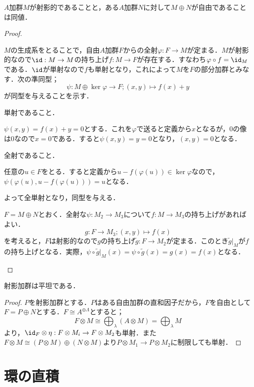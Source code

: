 \begin{thm}\label{thm:射影的と自由の直和因子は同値}
	$A$加群$M$が射影的であることと，ある$A$加群$N$に対して$M\oplus N$が自由であることは同値．
\end{thm}
\begin{proof}
	\begin{eqv}
		\item 
		$M$の生成系をとることで，自由$A$加群$F$からの全射$\varphi:F\to M$が定まる．$M$が射影的なので$\id:M\to M$の持ち上げ$f:M\to F$が存在する．すなわち$\varphi\circ f=\id_M$である．$\id$が単射なので$f$も単射となり，これによって$M$を$F$の部分加群とみなす．次の準同型；
		\[\psi:M\oplus \ker\varphi\to F;(x,y)\mapsto f(x)+y\]
		が同型を与えることを示す．
		
		\begin{mrkw}
			\item 単射であること．
			
			$\psi(x,y)=f(x)+y=0$とする．これを$\varphi$で送ると定義から$x$となるが，0の像は0なので$x=0$である．すると$\psi(x,y)=y=0$となり，$(x,y)=0$となる．
			\item 全射であること．
			
			任意の$u\in F$をとる．すると定義から$u-f(\varphi(u))\in\ker\varphi$なので，$\psi(\varphi(u),u-f(\varphi(u)))=u$となる．
		\end{mrkw}
		よって全単射となり，同型を与える．
		\item 
		$F=M\oplus N$とおく．全射な$\psi:M_2\to M_3$について$f:M\to M_3$の持ち上げがあればよい．
		\[g:F\to M_3;(x,y)\mapsto f(x)\]
		を考えると，$F$は射影的なので$g$の持ち上げ$\widetilde{g}:F\to M_2$が定まる．このとき$\widetilde{g}|_M$が$f$の持ち上げとなる．実際，$\psi\circ\widetilde{g}|_M(x)=\psi\circ\widetilde{g}(x)=g(x)=f(x)$となる．
	\end{eqv}
\end{proof}

\begin{thm}
	射影加群は平坦である．
\end{thm}
\begin{proof}
	$P$を射影加群とする．$P$はある自由加群の直和因子だから，$F$を自由として$F=P\oplus N$とする．$F\cong A^{\oplus\Lambda}$とすると；
	\[F\otimes M\cong \bigoplus_\lambda (A\otimes M)=\bigoplus_\lambda M\]
	より，$\id_{F}\otimes\eta:F\otimes M_i\to F\otimes M_2$も単射．また$F\otimes M\cong (P\otimes M)\oplus (N\otimes M)$より$P\otimes M_1\to P\otimes M_2$に制限しても単射．
\end{proof}

\section{環の直積}

